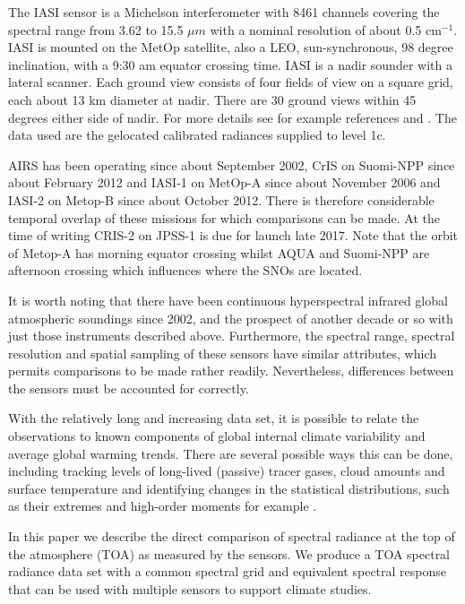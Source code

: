 \documentclass[twocolumn,10pt]{article}
\begin{document}
The IASI sensor is a Michelson interferometer with 8461 channels covering the spectral range from 3.62 to 15.5 $\mu m$ with a nominal resolution of about 0.5 cm$^{-1}$. IASI is mounted on the MetOp satellite, also a LEO, sun-synchronous, 98 degree inclination, with a 9:30 am equator crossing time. IASI is a nadir sounder with a lateral scanner. Each ground view consists of four fields of view on a square grid, each about 13 km diameter at nadir. There are 30 ground views within 45 degrees either side of nadir. For more details see for example references \cite{iasiweb} and \cite{iasiover}. The data used are the gelocated calibrated radiances supplied to level 1c.

AIRS has been operating since about September 2002, CrIS on Suomi-NPP since about February 2012 and IASI-1 on MetOp-A since about November 2006 and IASI-2 on Metop-B since about October 2012. There is therefore considerable temporal overlap of these missions for which comparisons can be made. At the time of writing CRIS-2 on JPSS-1 is due for launch late 2017. Note that the orbit of Metop-A has morning equator crossing whilst AQUA and Suomi-NPP are afternoon crossing which influences where the SNOs are located.

It is worth noting that there have been continuous hyperspectral infrared global atmospheric soundings since 2002, and the prospect of another decade or so with just those instruments described above. Furthermore, the spectral range, spectral resolution and spatial sampling of these sensors have similar attributes, which permits comparisons to be made rather readily. Nevertheless, differences between the sensors must be accounted for correctly.

With the relatively long and increasing data set, it is possible to relate the observations to known components of global internal climate variability and average global warming trends. There are several possible ways this can be done, including tracking levels of long-lived (passive) tracer gases, cloud amounts and surface temperature and identifying changes in the statistical distributions, such as their extremes and high-order moments for example \cite{DeSouzaMachado2017a}.

In this paper we describe the direct comparison of spectral radiance at the top of the atmosphere (TOA) as measured by the sensors. We produce a TOA spectral radiance data set with a common spectral grid and equivalent spectral response that can be used with multiple sensors to support climate studies.
\end{document}
